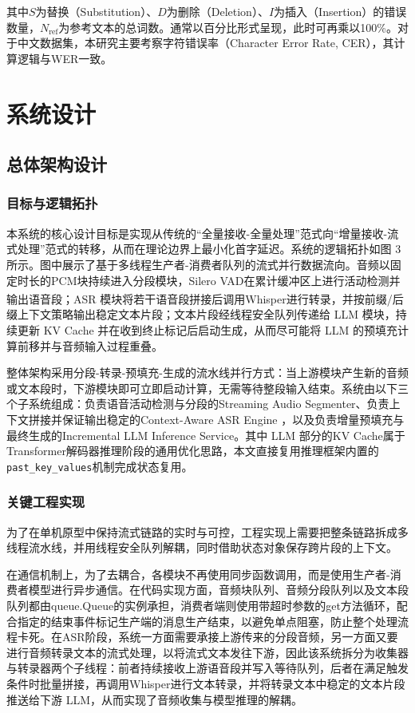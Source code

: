 \documentclass[UTF8,a4paper,zihao=5]{ctexart}
\newcommand{\upcite}[1]{\textsuperscript{\cite{#1}}}
\begin{document}
其中$S$为替换（Substitution）、$D$为删除（Deletion）、$I$为插入（Insertion）的错误数量，$N_{\mathrm{ref}}$为参考文本的总词数。通常以百分比形式呈现，此时可再乘以100\%。对于中文数据集，本研究主要考察字符错误率（Character Error Rate, CER），其计算逻辑与WER一致。

\section{系统设计}

\subsection{总体架构设计}

\subsubsection{目标与逻辑拓扑}

本系统的核心设计目标是实现从传统的“全量接收-全量处理”范式向“增量接收-流式处理”范式的转移，从而在理论边界上最小化首字延迟。系统的逻辑拓扑如图 3 所示。图中展示了基于多线程生产者-消费者队列的流式并行数据流向。音频以固定时长的PCM块持续进入分段模块，Silero VAD在累计缓冲区上进行活动检测并输出语音段\upcite{ref13}；ASR 模块将若干语音段拼接后调用Whisper进行转录，并按前缀/后缀上下文策略输出稳定文本片段；文本片段经线程安全队列传递给 LLM 模块，持续更新 KV Cache 并在收到终止标记后启动生成，从而尽可能将 LLM 的预填充计算前移并与音频输入过程重叠。

整体架构采用分段-转录-预填充-生成的流水线并行方式：当上游模块产生新的音频或文本段时，下游模块即可立即启动计算，无需等待整段输入结束。系统由以下三个子系统组成：负责语音活动检测与分段的Streaming Audio Segmenter、负责上下文拼接并保证输出稳定的Context-Aware ASR Engine ，以及负责增量预填充与最终生成的Incremental LLM Inference Service。其中 LLM 部分的KV Cache属于Transformer解码器推理阶段的通用优化思路，本文直接复用推理框架内置的\texttt{past\_key\_values}机制完成状态复用。

\subsubsection{关键工程实现}

为了在单机原型中保持流式链路的实时与可控，工程实现上需要把整条链路拆成多线程流水线，并用线程安全队列解耦，同时借助状态对象保存跨片段的上下文。

在通信机制上，为了去耦合，各模块不再使用同步函数调用，而是使用生产者-消费者模型进行异步通信。在代码实现方面，音频块队列、音频分段队列以及文本段队列都由queue.Queue的实例承担，消费者端则使用带超时参数的get方法循环，配合指定的结束事件标记生产端的消息生产结束，以避免单点阻塞，防止整个处理流程卡死。在ASR阶段，系统一方面需要承接上游传来的分段音频，另一方面又要进行音频转录文本的流式处理，以将流式文本发往下游，因此该系统拆分为收集器与转录器两个子线程：前者持续接收上游语音段并写入等待队列，后者在满足触发条件时批量拼接，再调用Whisper进行文本转录，并将转录文本中稳定的文本片段推送给下游 LLM，从而实现了音频收集与模型推理的解耦。
\end{document}
